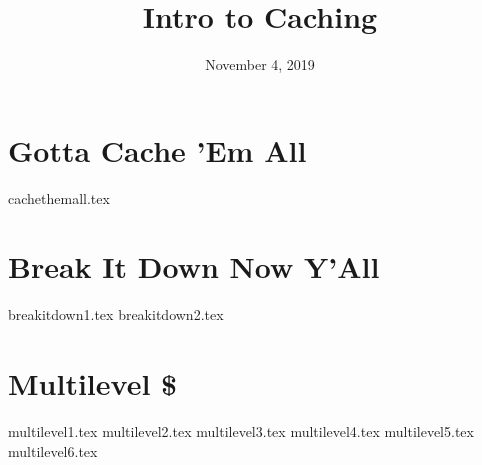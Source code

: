 \documentclass[11pt]{exam}
\title{Intro to Caching}
\date{November 4, 2019}
\begin{document}
\maketitle

\section{Gotta Cache 'Em All}
\begin{questions}
{cachethemall.tex}
\end{questions}
\newpage

\section{Break It Down Now Y'All}
\begin{questions}
{breakitdown1.tex}
{breakitdown2.tex}
\end{questions}
\newpage

\section{Multilevel \$}
\begin{questions}
{multilevel1.tex}
{multilevel2.tex}
{multilevel3.tex}
{multilevel4.tex}
{multilevel5.tex}
{multilevel6.tex}
\end{questions}
\newpage
\end{document}
